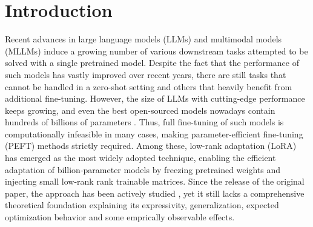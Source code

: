 \documentclass[a4paper,14pt]{extarticle}
\begin{document}
    \tableofcontents
    \vspace{1cm}


    \section{Introduction}
    

    Recent advances in large language models (LLMs) and multimodal models (MLLMs) induce a growing number of various downstream tasks attempted to be solved with a single pretrained model. 
    Despite the fact that the performance of such models has vastly improved over recent years, there are still tasks that cannot be handled in a zero-shot setting and others that heavily benefit from additional fine-tuning. 
    However, the size of LLMs with cutting-edge performance keeps growing, and even the best open-sourced models nowadays contain hundreds of billions of parameters \cite{deepseekai2025deepseekr1incentivizingreasoningcapability,kimiteam2025kimik2openagentic,yang2025qwen3technicalreport,grattafiori2024llama3herdmodels}. 
    Thus, full fine-tuning of such models is computationally infeasible in many cases, making parameter-efficient fine-tuning (PEFT) methods strictly required. 
    Among these, low-rank adaptation (LoRA) \cite{hu2021loralowrankadaptationlarge} has emerged as the most widely adopted technique, enabling the efficient adaptation of billion-parameter models by freezing pretrained weights and injecting small low-rank  rank trainable matrices. 
    Since the release of the original paper, the approach has been actively studied \cite{biderman2024lora, bernoulli2025lora, zeng2024expressivepowerlowrankadaptation, kratsios2025sharpgeneralizationboundsfoundation,jang2024why, malinovsky2024randomized}, yet it still lacks a comprehensive theoretical foundation explaining its expressivity, generalization, expected optimization behavior and some emprically observable effects.
    
\end{document}
